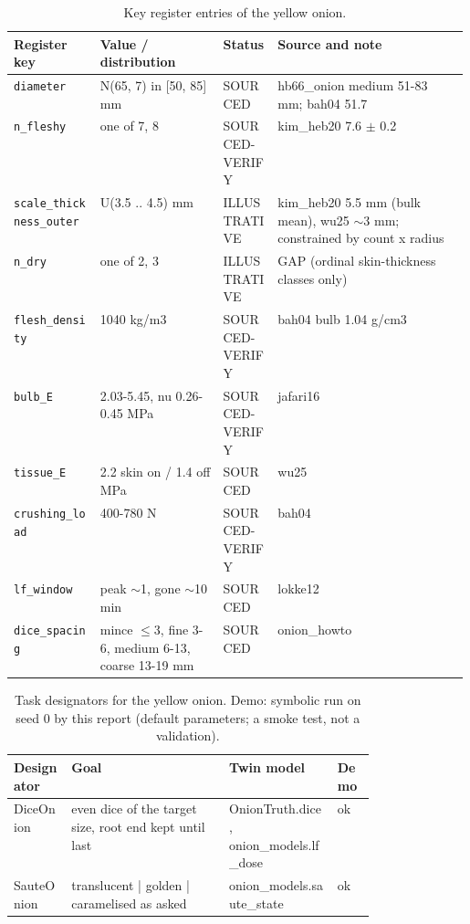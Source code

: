 \documentclass[10.5pt,a4paper]{article}
\begin{document}
\begin{table}[htbp]\centering\scriptsize\caption{Key register entries of the yellow onion.}
\begin{tabularx}{\linewidth}{@{}p{0.19\linewidth}p{0.27\linewidth}p{0.12\linewidth}X@{}}\toprule Register key & Value / distribution & Status & Source and note \\\midrule
\texttt{diameter} & N(65, 7) in [50, 85] mm & SOURCED & hb66\_onion medium 51-83 mm; bah04 51.7 \\
\texttt{n\_\allowbreak{}fleshy} & one of 7, 8 & SOURCED-VERIFY & kim\_heb20 7.6 $\pm$ 0.2 \\
\texttt{scale\_\allowbreak{}thickness\_\allowbreak{}outer} & U(3.5 .. 4.5) mm & ILLUSTRATIVE & kim\_heb20 5.5 mm (bulk mean), wu25 $\sim$3 mm; constrained by count x radius \\
\texttt{n\_\allowbreak{}dry} & one of 2, 3 & ILLUSTRATIVE & GAP (ordinal skin-thickness classes only) \\
\texttt{flesh\_\allowbreak{}density} & 1040 kg/m3 & SOURCED-VERIFY & bah04 bulb 1.04 g/cm3 \\
\texttt{bulb\_\allowbreak{}E} & 2.03-5.45, nu 0.26-0.45 MPa & SOURCED-VERIFY & jafari16 \\
\texttt{tissue\_\allowbreak{}E} & 2.2 skin on / 1.4 off MPa & SOURCED & wu25 \\
\texttt{crushing\_\allowbreak{}load} & 400-780 N & SOURCED-VERIFY & bah04 \\
\texttt{lf\_\allowbreak{}window} & peak $\sim$1, gone $\sim$10 min & SOURCED & lokke12 \\
\texttt{dice\_\allowbreak{}spacing} & mince $\le$3, fine 3-6, medium 6-13, coarse 13-19 mm & SOURCED & onion\_howto \\\bottomrule\end{tabularx}\end{table}
\begin{table}[htbp]\centering\scriptsize\caption{Task designators for the yellow onion. Demo: symbolic run on seed 0 by this report (default parameters; a smoke test, not a validation).}
\begin{tabularx}{\linewidth}{@{}p{0.16\linewidth}Xp{0.3\linewidth}l@{}}\toprule Designator & Goal & Twin model & Demo \\\midrule
DiceOnion & even dice of the target size, root end kept until last & OnionTruth.dice, onion\_models.lf\_dose & ok \\
SauteOnion & translucent | golden | caramelised as asked & onion\_models.saute\_state & ok \\\bottomrule\end{tabularx}\end{table}
\end{document}

